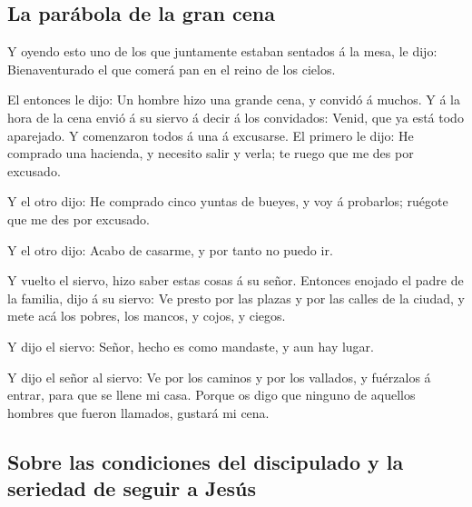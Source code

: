 \hypertarget{la-paruxe1bola-de-la-gran-cena}{%
\subsection{La parábola de la gran
cena}\label{la-paruxe1bola-de-la-gran-cena}}

 Y oyendo esto uno de los que juntamente estaban sentados
á la mesa, le dijo: Bienaventurado el que comerá pan en el reino de los
cielos.

 El entonces le dijo: Un hombre hizo una grande cena, y
convidó á muchos.  Y á la hora de la cena envió á su
siervo á decir á los convidados: Venid, que ya está todo aparejado.
 Y comenzaron todos á una á excusarse. El primero le
dijo: He comprado una hacienda, y necesito salir y verla; te ruego que
me des por excusado.

 Y el otro dijo: He comprado cinco yuntas de bueyes, y
voy á probarlos; ruégote que me des por excusado.

 Y el otro dijo: Acabo de casarme, y por tanto no puedo
ir.

 Y vuelto el siervo, hizo saber estas cosas á su señor.
Entonces enojado el padre de la familia, dijo á su siervo: Ve presto por
las plazas y por las calles de la ciudad, y mete acá los pobres, los
mancos, y cojos, y ciegos.

 Y dijo el siervo: Señor, hecho es como mandaste, y aun
hay lugar.

 Y dijo el señor al siervo: Ve por los caminos y por los
vallados, y fuérzalos á entrar, para que se llene mi casa.
 Porque os digo que ninguno de aquellos hombres que
fueron llamados, gustará mi cena.

\hypertarget{sobre-las-condiciones-del-discipulado-y-la-seriedad-de-seguir-a-jesuxfas}{%
\subsection{Sobre las condiciones del discipulado y la seriedad de
seguir a
Jesús}\label{sobre-las-condiciones-del-discipulado-y-la-seriedad-de-seguir-a-jesuxfas}}

